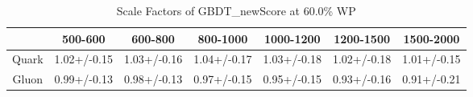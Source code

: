 \begin{table}
\centering
\caption{Scale Factors of GBDT_newScore at 60.0\% WP}
\label{tab:GBDT_newScore_0.6_Gluon}
\begin{tabular}{ccccccc}
\toprule
{} &      500-600 &      600-800 &     800-1000 &    1000-1200 &    1200-1500 &    1500-2000 \\
\midrule
Quark &  1.02+/-0.15 &  1.03+/-0.16 &  1.04+/-0.17 &  1.03+/-0.18 &  1.02+/-0.18 &  1.01+/-0.15 \\
Gluon &  0.99+/-0.13 &  0.98+/-0.13 &  0.97+/-0.15 &  0.95+/-0.15 &  0.93+/-0.16 &  0.91+/-0.21 \\
\bottomrule
\end{tabular}
\end{table}
